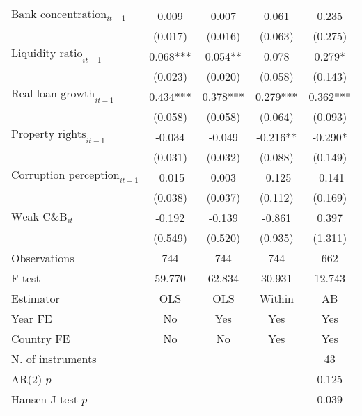 \begin{longtable}{m{8cm}*{4}{c}}
$\text{Bank concentration}_{it-1}$&       0.009   &       0.007   &       0.061   &       0.235   \\
                    &     (0.017)   &     (0.016)   &     (0.063)   &     (0.275)   \\
$\text{Liquidity ratio}_{it-1}$&       0.068***&       0.054** &       0.078   &       0.279*  \\
                    &     (0.023)   &     (0.020)   &     (0.058)   &     (0.143)   \\
$\text{Real loan growth}_{it-1}$&       0.434***&       0.378***&       0.279***&       0.362***\\
                    &     (0.058)   &     (0.058)   &     (0.064)   &     (0.093)   \\
$\text{Property rights}_{it-1}$&      -0.034   &      -0.049   &      -0.216** &      -0.290*  \\
                    &     (0.031)   &     (0.032)   &     (0.088)   &     (0.149)   \\
$\text{Corruption perception}_{it-1}$&      -0.015   &       0.003   &      -0.125   &      -0.141   \\
                    &     (0.038)   &     (0.037)   &     (0.112)   &     (0.169)   \\
$\text{Weak C\&B}_{it}$&      -0.192   &      -0.139   &      -0.861   &       0.397   \\
                    &     (0.549)   &     (0.520)   &     (0.935)   &     (1.311)   \\
\midrule
Observations        &         744   &         744   &         744   &         662   \\
F-test              &      59.770   &      62.834   &      30.931   &      12.743   \\
Estimator           &         OLS   &         OLS   &      Within   &          AB   \\
Year FE             &          No   &         Yes   &         Yes   &         Yes   \\
Country FE          &          No   &          No   &         Yes   &         Yes   \\
N. of instruments   &               &               &               &          43   \\
AR(2) \(p\)         &               &               &               &       0.125   \\
Hansen J test \(p\) &               &               &               &       0.039   \\

\end{longtable}
